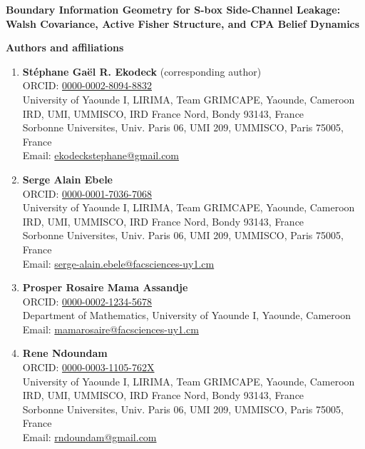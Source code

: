 \documentclass[11pt,a4paper]{article}
\begin{document}
\begin{center}
{\Large\bfseries Boundary Information Geometry for S-box Side-Channel Leakage:
Walsh Covariance, Active Fisher Structure, and CPA Belief Dynamics}
\end{center}

\vspace{1em}

\textbf{Authors and affiliations}

\begin{enumerate}
  \item \textbf{St\'ephane Ga\"el R. Ekodeck} (corresponding author)\\
        ORCID: \href{https://orcid.org/0000-0002-8094-8832}{0000-0002-8094-8832}\\
        University of Yaounde I, LIRIMA, Team GRIMCAPE, Yaounde, Cameroon\\
        IRD, UMI, UMMISCO, IRD France Nord, Bondy 93143, France\\
        Sorbonne Universites, Univ. Paris 06, UMI 209, UMMISCO, Paris 75005, France\\
        Email: \href{mailto:ekodeckstephane@gmail.com}{ekodeckstephane@gmail.com}

  \item \textbf{Serge Alain Ebele}\\
        ORCID: \href{https://orcid.org/0000-0001-7036-7068}{0000-0001-7036-7068}\\
        University of Yaounde I, LIRIMA, Team GRIMCAPE, Yaounde, Cameroon\\
        IRD, UMI, UMMISCO, IRD France Nord, Bondy 93143, France\\
        Sorbonne Universites, Univ. Paris 06, UMI 209, UMMISCO, Paris 75005, France\\
        Email: \href{mailto:serge-alain.ebele@facsciences-uy1.cm}{serge-alain.ebele@facsciences-uy1.cm}

  \item \textbf{Prosper Rosaire Mama Assandje}\\
        ORCID: \href{https://orcid.org/0000-0002-1234-5678}{0000-0002-1234-5678}\\
        Department of Mathematics, University of Yaounde I, Yaounde, Cameroon\\
        Email: \href{mailto:mamarosaire@facsciences-uy1.cm}{mamarosaire@facsciences-uy1.cm}

  \item \textbf{Rene Ndoundam}\\
        ORCID: \href{https://orcid.org/0000-0003-1105-762X}{0000-0003-1105-762X}\\
        University of Yaounde I, LIRIMA, Team GRIMCAPE, Yaounde, Cameroon\\
        IRD, UMI, UMMISCO, IRD France Nord, Bondy 93143, France\\
        Sorbonne Universites, Univ. Paris 06, UMI 209, UMMISCO, Paris 75005, France\\
        Email: \href{mailto:rndoundam@gmail.com}{rndoundam@gmail.com}
\end{enumerate}
\end{document}
